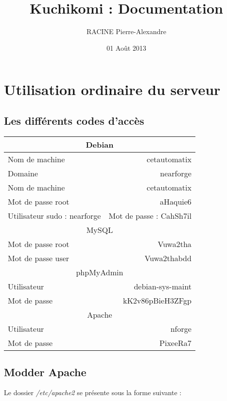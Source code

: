 \documentclass[a4paper,12pt,titlepage]{article}
\begin{document}
\title{Kuchikomi : Documentation}
\author{RACINE Pierre-Alexandre}
\date{01 Août 2013}

\maketitle

\newpage

\tableofcontents

\newpage


\section{Utilisation ordinaire du serveur}

\subsection{Les différents codes d'accès}

\begin{tabular}{|l|r|}
  \hline \multicolumn{2}{c|}{Debian} \\
  \hline Nom de machine & cetautomatix \\
  \hline Domaine & nearforge \\
  \hline Nom de machine & cetautomatix \\
  \hline Mot de passe root & aHaquie6 \\
  \hline Utilisateur sudo : nearforge & Mot de passe : CahSh7il \\
  \hline \multicolumn{2}{c|}{MySQL} \\
  \hline Mot de passe root & Vuwa2tha \\
  \hline Mot de passe user & Vuwa2thabdd \\
  \hline \multicolumn{2}{c|}{phpMyAdmin} \\
  \hline Utilisateur & debian-sys-maint \\
  \hline Mot de passe & kK2v86pBieH3ZFgp \\
  \hline \multicolumn{2}{c|}{Apache} \\
  \hline Utilisateur & nforge \\
  \hline Mot de passe & PixeeRa7 \\
  \hline
\end{tabular}

\newpage

\subsection{Modder Apache}
Le dossier \emph{/etc/apache2} se présente sous la forme suivante :
\end{document}
